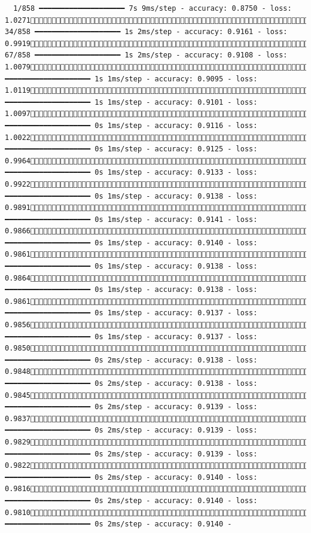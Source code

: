 \documentclass[
  letterpaper,
  DIV=11,
  numbers=noendperiod]{scrartcl}
\begin{document}
\begin{verbatim}
  1/858 ━━━━━━━━━━━━━━━━━━━━ 7s 9ms/step - accuracy: 0.8750 - loss: 1.0271 34/858 ━━━━━━━━━━━━━━━━━━━━ 1s 2ms/step - accuracy: 0.9161 - loss: 0.9919 67/858 ━━━━━━━━━━━━━━━━━━━━ 1s 2ms/step - accuracy: 0.9108 - loss: 1.0079103/858 ━━━━━━━━━━━━━━━━━━━━ 1s 1ms/step - accuracy: 0.9095 - loss: 1.0119140/858 ━━━━━━━━━━━━━━━━━━━━ 1s 1ms/step - accuracy: 0.9101 - loss: 1.0097176/858 ━━━━━━━━━━━━━━━━━━━━ 0s 1ms/step - accuracy: 0.9116 - loss: 1.0022212/858 ━━━━━━━━━━━━━━━━━━━━ 0s 1ms/step - accuracy: 0.9125 - loss: 0.9964248/858 ━━━━━━━━━━━━━━━━━━━━ 0s 1ms/step - accuracy: 0.9133 - loss: 0.9922284/858 ━━━━━━━━━━━━━━━━━━━━ 0s 1ms/step - accuracy: 0.9138 - loss: 0.9891320/858 ━━━━━━━━━━━━━━━━━━━━ 0s 1ms/step - accuracy: 0.9141 - loss: 0.9866355/858 ━━━━━━━━━━━━━━━━━━━━ 0s 1ms/step - accuracy: 0.9140 - loss: 0.9861391/858 ━━━━━━━━━━━━━━━━━━━━ 0s 1ms/step - accuracy: 0.9138 - loss: 0.9864429/858 ━━━━━━━━━━━━━━━━━━━━ 0s 1ms/step - accuracy: 0.9138 - loss: 0.9861466/858 ━━━━━━━━━━━━━━━━━━━━ 0s 1ms/step - accuracy: 0.9137 - loss: 0.9856502/858 ━━━━━━━━━━━━━━━━━━━━ 0s 1ms/step - accuracy: 0.9137 - loss: 0.9850509/858 ━━━━━━━━━━━━━━━━━━━━ 0s 2ms/step - accuracy: 0.9138 - loss: 0.9848519/858 ━━━━━━━━━━━━━━━━━━━━ 0s 2ms/step - accuracy: 0.9138 - loss: 0.9845542/858 ━━━━━━━━━━━━━━━━━━━━ 0s 2ms/step - accuracy: 0.9139 - loss: 0.9837570/858 ━━━━━━━━━━━━━━━━━━━━ 0s 2ms/step - accuracy: 0.9139 - loss: 0.9829598/858 ━━━━━━━━━━━━━━━━━━━━ 0s 2ms/step - accuracy: 0.9139 - loss: 0.9822631/858 ━━━━━━━━━━━━━━━━━━━━ 0s 2ms/step - accuracy: 0.9140 - loss: 0.9816663/858 ━━━━━━━━━━━━━━━━━━━━ 0s 2ms/step - accuracy: 0.9140 - loss: 0.9810697/858 ━━━━━━━━━━━━━━━━━━━━ 0s 2ms/step - accuracy: 0.9140 - 
\end{verbatim}
\end{document}
